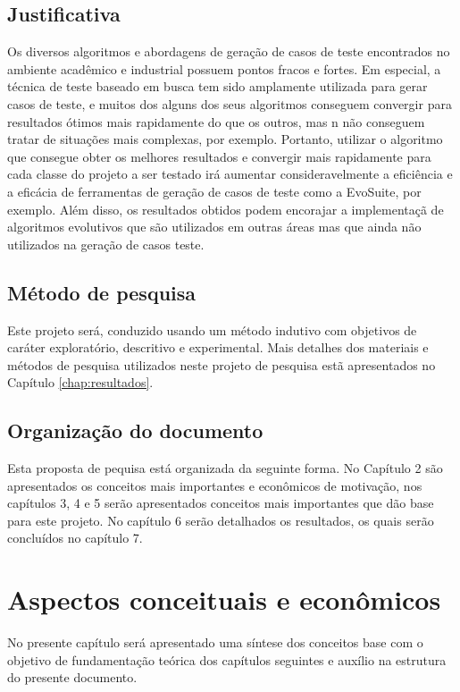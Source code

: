 \documentclass[
	12pt,				%
	oneside,			%
	a4paper,			%
	english,			%
	brazil				%
	]{abntex2ppgsi}
\begin{document}
\section{Justificativa}
Os diversos algoritmos e abordagens de geração de casos de teste encontrados no ambiente acadêmico e industrial possuem pontos fracos e fortes. Em especial, a técnica de teste baseado em busca tem sido amplamente utilizada para gerar casos de teste, e muitos dos alguns dos seus algoritmos conseguem convergir para resultados  ótimos mais rapidamente do que os outros, mas n não conseguem tratar de situações mais complexas, por exemplo. Portanto, utilizar o algoritmo que consegue obter os melhores resultados e convergir mais rapidamente para cada classe do projeto a ser testado irá aumentar consideravelmente a eficiência e a eficácia de ferramentas de geração de casos de teste como a EvoSuite, por exemplo. Além disso, os resultados obtidos podem encorajar a implementaçã de algoritmos evolutivos que são utilizados em outras áreas mas que ainda não utilizados na geração de casos teste.

\section{Método de pesquisa}
Este projeto será, conduzido usando um método indutivo com objetivos de caráter exploratório, descritivo e experimental. Mais detalhes dos materiais e métodos de pesquisa utilizados neste projeto de pesquisa estã apresentados no Capítulo \ref{chap:resultados}.

\section{Organização do documento}
Esta proposta de pequisa está organizada da seguinte forma. No Capítulo 2 são apresentados os conceitos mais importantes  e econômicos de motivação, nos capítulos 3, 4 e 5 serão apresentados conceitos mais importantes que dão base para este projeto. No capítulo 6 serão detalhados os resultados, os quais serão concluídos no capítulo 7.






\chapter{Aspectos conceituais e econômicos}
No presente capítulo será apresentado uma síntese dos conceitos base com o objetivo de fundamentação teórica dos capítulos seguintes e auxílio na estrutura do presente documento.
\end{document}
